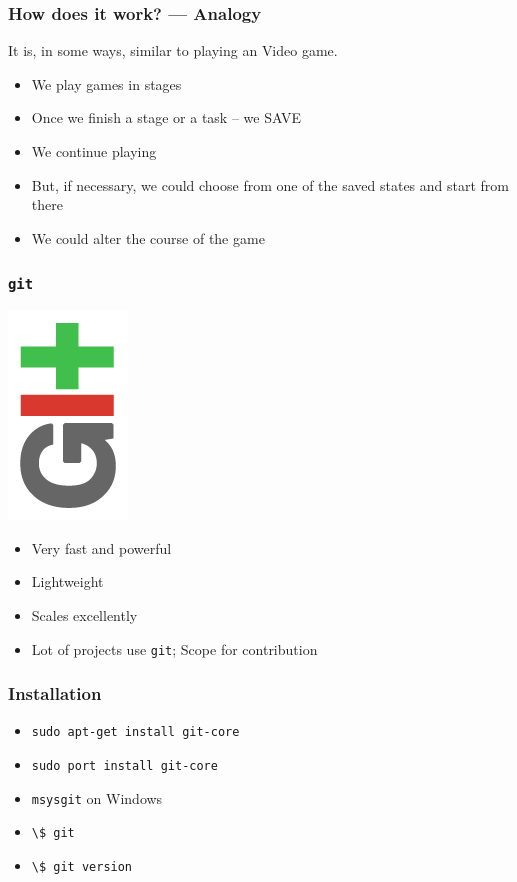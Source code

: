 \documentclass[14pt,compress]{beamer}
\newcommand{\typ}[1]{\lstinline{#1}}
\begin{document}
\begin{frame}[fragile]
  \frametitle{How does it work? --- Analogy}
  It is, in some ways, similar to playing an Video game.
  \begin{itemize}
  \item We play games in stages
  \item Once we finish a stage or a task -- \alert{we SAVE}
  \item We continue playing
  \item But, if necessary, we could choose from one of the saved
    states and start from there
  \item We could alter the course of the game
  \end{itemize}
\end{frame}


\begin{frame}
  \frametitle{\typ{git}}
  \begin{center}
    \includegraphics[height=.75in,interpolate=true]{images/git-logo}
  \end{center}
  \begin{itemize}
  \item Very fast and powerful
  \item Lightweight
  \item Scales excellently
  \item Lot of projects use \typ{git}; Scope for contribution
  \end{itemize}
\end{frame}

\begin{frame}
  \frametitle{Installation}
  \begin{itemize}
  \item \typ{sudo apt-get install git-core}
  \item \typ{sudo port install git-core}
  \item \typ{msysgit} on Windows
  \item \typ{\$ git}
  \item \typ{\$ git version}
  \end{itemize}
\end{frame}
\end{document}
